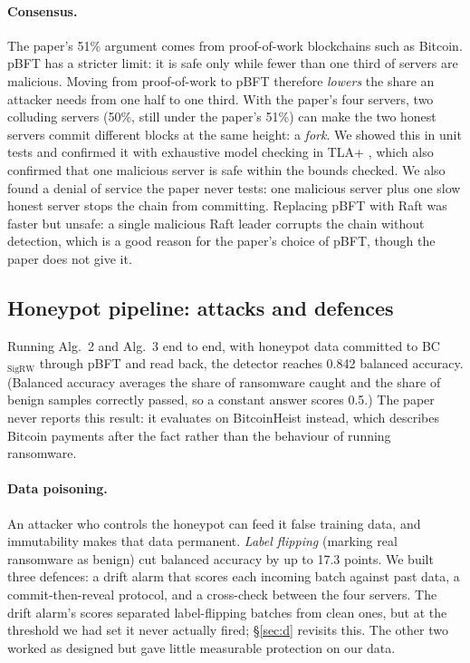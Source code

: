 \documentclass[11pt]{article}
\newcommand{\sigrw}{BC$_{\mathrm{SigRW}}$}
\begin{document}
\paragraph{Consensus.} The paper's 51\% argument comes from proof-of-work blockchains such as
Bitcoin. pBFT has a stricter limit: it is safe only while fewer than one third of servers are
malicious. Moving from proof-of-work to pBFT therefore \emph{lowers} the share an attacker needs
from one half to one third. With the paper's four servers, two colluding servers (50\%, still under
the paper's 51\%) can make the two honest servers commit different blocks at the same height: a
\emph{fork}. We showed this in unit tests and confirmed it with exhaustive model checking in TLA+
\citep{lamport2002tla}, which also confirmed that one malicious server is safe within the bounds checked. We also found
a denial of service the paper never tests: one malicious server plus one slow honest server stops
the chain from committing. Replacing pBFT with Raft \citep{ongaro2014raft} was faster but unsafe:
a single malicious Raft leader corrupts the chain without detection, which is a good reason for
the paper's choice of pBFT, though the paper does not give it.

\subsection{Honeypot pipeline: attacks and defences}
Running Alg.~2 and Alg.~3 end to end, with honeypot data committed to \sigrw{} through pBFT and
read back, the detector reaches 0.842 balanced accuracy. (Balanced accuracy averages the share of
ransomware caught and the share of benign samples correctly passed, so a constant answer scores
0.5.) The paper never reports this result: it evaluates on BitcoinHeist instead, which describes
Bitcoin payments after the fact rather than the behaviour of running ransomware.

\paragraph{Data poisoning.} An attacker who controls the honeypot can feed it false training data,
and immutability makes that data permanent. \emph{Label flipping} (marking real ransomware as
benign) cut balanced accuracy by up to 17.3 points. We built three defences: a drift alarm that
scores each incoming batch against past data, a commit-then-reveal protocol, and a cross-check
between the four servers. The drift alarm's scores separated label-flipping batches from clean
ones, but at the threshold we had set it never actually fired; \S\ref{sec:d} revisits this. The
other two worked as designed but gave little measurable protection on our data.
\end{document}
